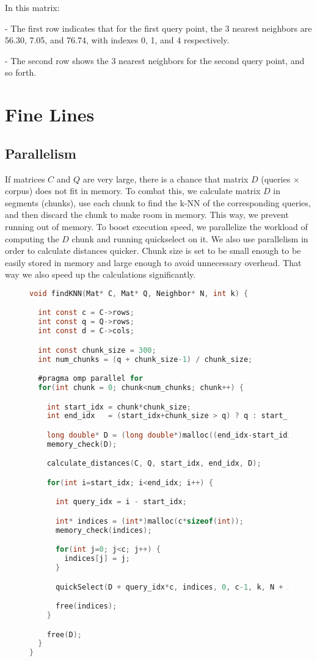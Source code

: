 \documentclass{article}
\begin{document}
In this matrix:

- The first row indicates that for the first query point, the 3 nearest neighbors are 56.30, 7.05, and 76.74, with indexes 0, 1, and 4 respectively.

- The second row shows the 3 nearest neighbors for the second query point, and so forth.

\section{Fine Lines}

\subsection{Parallelism}
If matrices \( C \) and \( Q \) are very large, there is a chance that matrix \( D \) (queries $\times$ corpus) does not fit in memory. To combat this, we calculate matrix \( D \) in segments (chunks), use each chunk to find the k-NN of the corresponding queries, and then discard the chunk to make room in memory. This way, we prevent running out of memory. To boost execution speed, we parallelize the workload of computing the \( D \) chunk and running quickselect on it. We also use parallelism in order to calculate distances quicker. Chunk size is set to be small enough to be easily stored in memory and large enough to avoid unnecessary overhead. That way we also speed up the calculations significantly.

\begin{figure}[H]
\begin{lstlisting}[language=C, caption={Routine for computing the k smallest distances}]
void findKNN(Mat* C, Mat* Q, Neighbor* N, int k) {

  int const c = C->rows;
  int const q = Q->rows;
  int const d = C->cols;

  int const chunk_size = 300;
  int num_chunks = (q + chunk_size-1) / chunk_size;

  #pragma omp parallel for
  for(int chunk = 0; chunk<num_chunks; chunk++) {

    int start_idx = chunk*chunk_size;
    int end_idx   = (start_idx+chunk_size > q) ? q : start_idx+chunk_size;

    long double* D = (long double*)malloc((end_idx-start_idx)*c*sizeof(long double));
    memory_check(D);

    calculate_distances(C, Q, start_idx, end_idx, D);

    for(int i=start_idx; i<end_idx; i++) {

      int query_idx = i - start_idx;

      int* indices = (int*)malloc(c*sizeof(int));
      memory_check(indices);

      for(int j=0; j<c; j++) {
        indices[j] = j;
      }

      quickSelect(D + query_idx*c, indices, 0, c-1, k, N + i*k);

      free(indices);
    }

    free(D);
  }
}
\end{lstlisting}
\end{figure}
\end{document}
